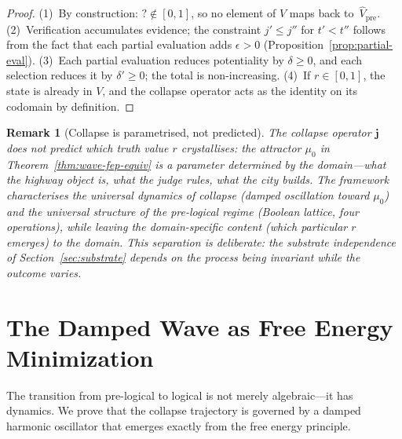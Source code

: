 \documentclass[11pt,a4paper]{article}
\newtheorem{remark}[theorem]{Remark}
\begin{document}
\begin{proof}
(1)~By construction: $? \notin [0,1]$, so no element of $V$ maps back
to~$\hat{V}_{\mathrm{pre}}$.
(2)~Verification accumulates evidence; the constraint $j' \leq j''$ for
$t' < t''$ follows from the fact that each partial evaluation adds
$\epsilon > 0$ (Proposition~\ref{prop:partial-eval}).
(3)~Each partial evaluation reduces potentiality by $\delta \geq 0$, and
each selection reduces it by $\delta' \geq 0$; the total is non-increasing.
(4)~If $r \in [0,1]$, the state is already in $V$, and the collapse
operator acts as the identity on its codomain by definition.
\end{proof}

\begin{remark}[Collapse is parametrised, not predicted]
\label{rem:collapse-param}
The collapse operator $\mathbf{j}$ does not predict \emph{which}
truth value $r$ crystallises: the attractor $\mu_0$ in
Theorem~\ref{thm:wave-fep-equiv} is a parameter determined by the
domain---what the highway object is, what the judge rules, what the
city builds. The framework characterises the universal
\emph{dynamics} of collapse (damped oscillation toward $\mu_0$)
and the universal \emph{structure} of the pre-logical regime
(Boolean lattice, four operations), while leaving the
domain-specific \emph{content} (which particular $r$ emerges)
to the domain. This separation is deliberate: the substrate
independence of Section~\ref{sec:substrate} depends on the
process being invariant while the outcome varies.
\end{remark}

\section{The Damped Wave as Free Energy Minimization}
\label{sec:wave-fep}

The transition from pre-logical to logical is not merely algebraic---it
has dynamics. We prove that the collapse trajectory is governed by a
damped harmonic oscillator that emerges exactly from the free energy
principle.
\end{document}
